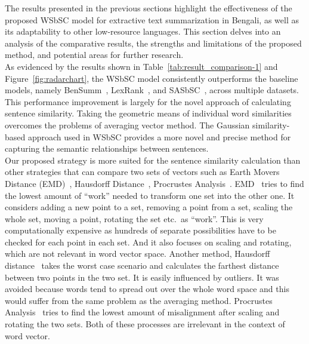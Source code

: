 The results presented in the previous sections highlight the effectiveness of the
proposed WSbSC model for extractive text summarization
in Bengali, as well as its adaptability to other low-resource languages.
This section delves into an analysis of the comparative results, the strengths and limitations of the proposed method,
and potential areas for further research.\\

As evidenced by the results shown in Table~\ref{tab:result_comparison-1} and Figure~\ref{fig:radarchart},
the WSbSC model consistently outperforms the baseline models,
namely BenSumm~\cite{das-2022-tfidf}, LexRank~\cite{Erkan-lexRank-2004},
and SASbSC~\cite{roychowdhury-etal-2022-spectral-base}, across multiple datasets.
This performance improvement is largely for the novel approach of calculating sentence similarity.
Taking the geometric means of individual word similarities overcomes the problems of averaging vector method.
The Gaussian similarity-based approach used in WSbSC provides a more novel and precise method for
capturing the semantic relationships between sentences.\\

Our proposed strategy is more suited for the sentence similarity calculation
than other strategies that can compare two sets of vectors
such as Earth Movers Distance (EMD)~\cite{Rubner-19998-emd},
Hausdorff Distance~\cite{hausdorff-1914-hausdorff-distance},
Procrustes Analysis~\cite{Gower-1975-procrustes-distance}.
EMD~\cite{Rubner-19998-emd} tries to find the lowest amount of ``work'' needed to transform one set into the other one.
It considers adding a new point to a set, removing a point from a set,
scaling the whole set, moving a point, rotating the set etc.\ as ``work''.
This is very computationally expensive as hundreds of separate possibilities have to be checked for each
point in each set.
And it also focuses on scaling and rotating, which are not relevant in word vector space.
Another method, Hausdorff distance~\cite{hausdorff-1914-hausdorff-distance} takes the worst case scenario
and calculates the farthest distance between two points in the two set.
It is easily influenced by outliers.
It was avoided because words tend to spread out over the whole word space and this would suffer
from the same problem as the averaging method.
Procrustes Analysis~\cite{Gower-1975-procrustes-distance} tries to find the lowest
amount of misalignment after scaling and rotating the two sets.
Both of these processes are irrelevant in the context of word vector.\\

